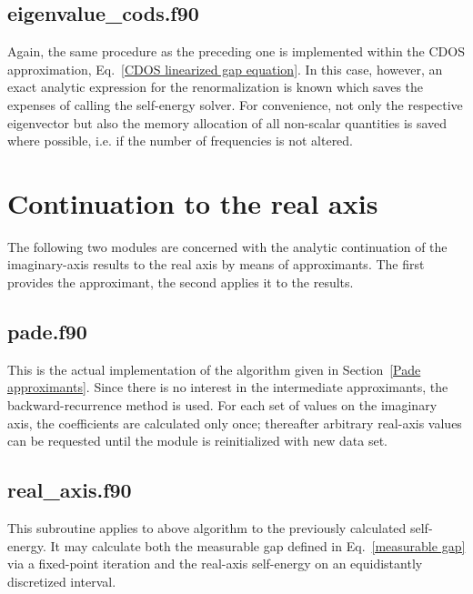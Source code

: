 

\subsection{eigenvalue\_cods.f90}

Again, the same procedure as the preceding one is implemented within the CDOS
approximation, Eq.~\ref{CDOS linearized gap equation}. In this case, however, an
exact analytic expression for the renormalization is known which saves the
expenses of calling the self-energy solver. For convenience, not only the
respective eigenvector but also the memory allocation of all non-scalar
quantities is saved where possible, i.e. if the number of 
frequencies is not altered.



\section{Continuation to the real axis}
\label{real_axis}

The following two modules are concerned with the analytic continuation of the
imaginary-axis results to the real axis by means of  approximants.
The first provides the approximant, the second applies it to the results.

\subsection{pade.f90}

This is the actual implementation of the algorithm given in Section~\ref{Pade
approximants}. Since there is no interest in the intermediate approximants, the
backward-recurrence method is used. For each set of values on the imaginary
axis, the coefficients are calculated only once; thereafter arbitrary real-axis
values can be requested until the module is reinitialized with new data set.



\subsection{real\_axis.f90}

This subroutine applies to above algorithm to the previously calculated
self-energy. It may calculate both the measurable gap defined in
Eq.~\ref{measurable gap} via a fixed-point iteration and the real-axis
self-energy on an equidistantly discretized interval.

